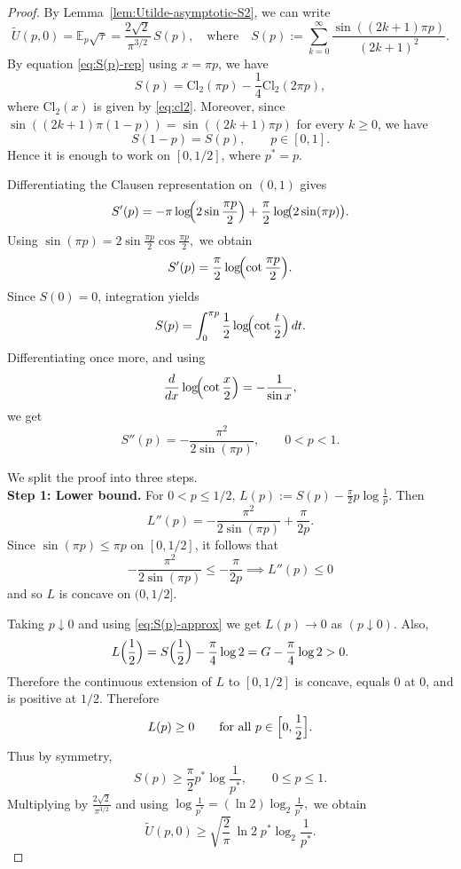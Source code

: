 \documentclass[10pt,a4paper]{amsart}
\begin{document}
\begin{proof}
By Lemma~\ref{lem:Utilde-asymptotic-S2}, we can write
\[
\tilde U(p,0)=\mathbb E_p\sqrt{\tau}
=
\frac{2\sqrt2}{\pi^{3/2}}\,S(p),
\quad
\text{where}
\quad 
S(p):=\sum_{k=0}^\infty \frac{\sin((2k+1)\pi p)}{(2k+1)^2}.
\]
By equation \eqref{eq:S(p)-rep} using $x=\pi p$, we have 
\[
S(p)=\mathrm{Cl}_2(\pi p)-\frac14 \mathrm{Cl}_2(2\pi p),
\]
where $\mathrm{Cl}_2(x)$ is given by \eqref{eq:cl2}.
Moreover, since 
$
\sin((2k+1)\pi(1-p))
=
\sin((2k+1)\pi p)
$
for every $k\ge 0$, we have
\[
S(1-p)=S(p), \qquad p\in[0,1].
\]
Hence it is enough to work on $[0,1/2]$, where $p^*=p$.

Differentiating the Clausen representation on $(0,1)$ gives
\[
S'(p)
=
-\pi\log\!\Bigl(2\sin\frac{\pi p}{2}\Bigr)
+\frac{\pi}{2}\log\!\bigl(2\sin(\pi p)\bigr).
\]
Using
$
\sin(\pi p)=2\sin\frac{\pi p}{2}\cos\frac{\pi p}{2},
$
we obtain
\[
S'(p)
=
\frac{\pi}{2}\log\!\Bigl(\cot\frac{\pi p}{2}\Bigr).
\]
Since $S(0)=0$, integration yields
\[
S(p)=\int_0^{\pi p}\frac12\log\!\Bigl(\cot\frac t2\Bigr)\,dt.
\]
Differentiating once more, and using
\[
\frac{d}{dx}\log\!\Bigl(\cot\frac x2\Bigr)=-\frac1{\sin x},
\]
we get
\[
S''(p)=-\frac{\pi^2}{2\sin(\pi p)},
\qquad 0<p<1.
\]

We split the proof into three steps.\\

\textbf{Step 1: Lower bound.}
For $0<p\le 1/2$,
$
L(p):=S(p)-\frac{\pi}{2}p\log\frac1p.
$
Then
\[
L''(p)
=
-\frac{\pi^2}{2\sin(\pi p)}+\frac{\pi}{2p}.
\]
Since $\sin(\pi p)\le \pi p$ on $[0,1/2]$, it follows that
\[
-\frac{\pi^2}{2\sin(\pi p)}\le -\frac{\pi}{2p}\implies L''(p)\le 0
\]
 and so
$L$ is concave on $(0,1/2]$.

Taking $ p\downarrow0$ and using \eqref{eq:S(p)-approx} we get
$
L(p)\to 0
$ as $ (p\downarrow0).
$
Also,
\[
L\Bigl(\frac12\Bigr)
=
S\Bigl(\frac12\Bigr)-\frac{\pi}{4}\log2
=
G-\frac{\pi}{4}\log2
>0.
\]
Therefore the continuous extension of $L$ to $[0,1/2]$ is concave, equals $0$ at $0$, and is positive at $1/2$.
Therefore
\[
L(p)\ge 0
\qquad \text{for all } p\in\Bigl[0,\frac12\Bigr].
\]
Thus 
by symmetry,
\[
S(p)\ge \frac{\pi}{2}p^*\log\frac1{p^*},
\qquad 0\le p\le 1.
\]
Multiplying by $\frac{2\sqrt2}{\pi^{3/2}}$ and using
$
\log\frac1{p^*}=(\ln2)\log_2\frac1{p^*},
$
we obtain
\[
\tilde U(p,0)\ge \sqrt{\frac2\pi}\,\ln2 \; p^*\log_2\frac1{p^*}.
\]


\end{proof}
\end{document}
